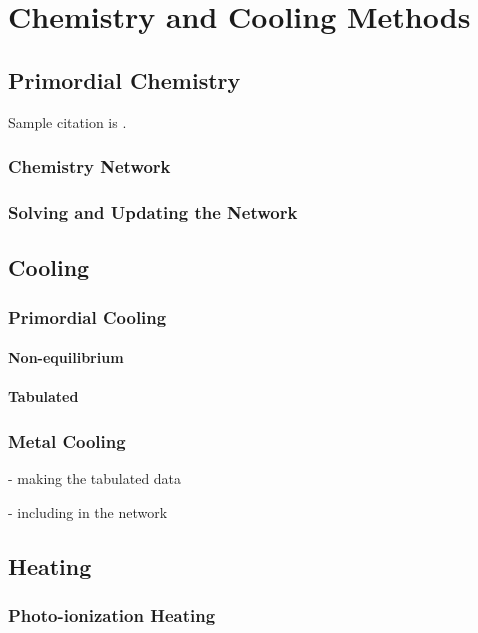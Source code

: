 \section{Chemistry and Cooling Methods} \label{sec:physics}



\subsection{Primordial Chemistry}
Sample citation is \citet{1997NewA....2..181A}.

\subsubsection{Chemistry Network}


\subsubsection{Solving and Updating the Network}



\subsection{Cooling}


\subsubsection{Primordial Cooling}

\paragraph{Non-equilibrium}

\paragraph{Tabulated}


\subsubsection{Metal Cooling}
- making the tabulated data

- including in the network


\subsection{Heating}


\subsubsection{Photo-ionization Heating}


